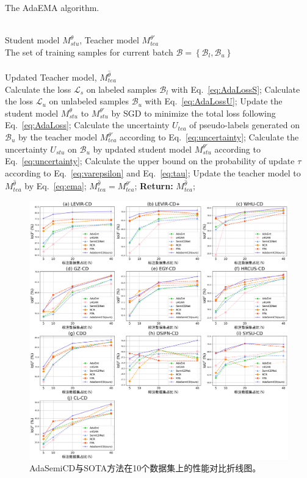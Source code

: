 \documentclass[lang=chs, degree=master, blindreview=false, adobe=false]{yanputhesis}
\begin{document}
\begin{algorithm}[tb]
  \caption{The AdaEMA algorithm.}
  \label{alg:AdaEMA}
  \begin{algorithmic}[1] %
    \Require ~~\\
    Student model $M_{stu}^{\theta}$, Teacher model $M_{tea}^{\theta'}$ \\
    The set of training samples for current batch $\mathcal{B} = \left \{\mathcal{B}_l, \mathcal{B}_u\right \}$ \\
  \Ensure ~~\\
    Updated Teacher model, $M_{tea}^{\hat{\theta}}$ \\
  \State Calculate the loss $\mathcal{L}_{s}$ on labeled samples $\mathcal{B}_l$ with Eq.~\ref{eq:AdaLossS};
  \State Calculate the loss $\mathcal{L}_{u}$ on unlabeled samples $\mathcal{B}_u$ with Eq.~\ref{eq:AdaLossU};
  \State Update the student model $M_{stu}^{\theta}$ to $M_{stu}^{\theta'}$ by SGD to minimize the total loss following Eq.~\ref{eq:AdaLoss};
  \State Calculate the uncertainty ${U}_{tea}$ of pseudo-labels generated on $\mathcal{B}_u$ by the teacher model $M_{tea}^{\theta'}$ according to Eq.~\ref{eq:uncertainty};
  \State Calculate the uncertainty ${U}_{stu}$ on $\mathcal{B}_u$ by updated student model $M_{stu}^{\theta'}$ according to Eq.~\ref{eq:uncertainty};
  \State Calculate the upper bound on the probability of update $\tau$ according to Eq.~\ref{eq:varepsilon} and Eq.~\ref{eq:tau};
    \State Update the teacher model to $M_{tea}^{\hat{\theta}}$ by Eq.~\ref{eq:ema};
  \Else
    \State $M_{tea}^{\hat{\theta}} = M_{tea}^{\theta'}$;
  \EndIf
  \State \textbf{Return:} $M_{tea}^{\hat{\theta}}$;
  \end{algorithmic}
\end{algorithm}
\begin{figure}[htb]
  \centering
  \includegraphics[scale=0.30]{images/vis_plot.png}
  \caption{
    AdaSemiCD与SOTA方法在10个数据集上的性能对比折线图。
  }
  \label{fig:iou_plot}
\end{figure}
\end{document}
